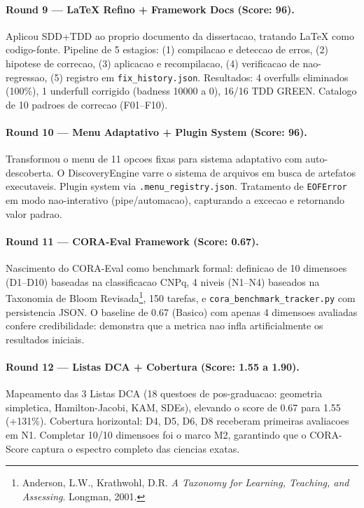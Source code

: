 \paragraph{Round 9 --- LaTeX Refino + Framework Docs (Score: 96).}

Aplicou SDD+TDD ao proprio documento da dissertacao, tratando LaTeX
como codigo-fonte. Pipeline de 5 estagios: (1) compilacao e deteccao
de erros, (2) hipotese de correcao, (3) aplicacao e recompilacao,
(4) verificacao de nao-regressao, (5) registro em \texttt{fix\_history.json}.
Resultados: 4 overfulls eliminados (100\%), 1 underfull corrigido
(badness 10000 a 0), 16/16 TDD GREEN. Catalogo de 10 padroes de
correcao (F01--F10).

\paragraph{Round 10 --- Menu Adaptativo + Plugin System (Score: 96).}

Transformou o menu de 11 opcoes fixas para sistema adaptativo com
auto-descoberta. O DiscoveryEngine varre o sistema de arquivos em busca
de artefatos executaveis. Plugin system via \texttt{.menu\_registry.json}.
Tratamento de \texttt{EOFError} em modo nao-interativo (pipe/automacao),
capturando a excecao e retornando valor padrao.

\paragraph{Round 11 --- CORA-Eval Framework (Score: 0.67).}

Nascimento do CORA-Eval como benchmark formal: definicao de 10 dimensoes
(D1--D10) baseadas na classificacao CNPq, 4 niveis (N1--N4) baseados na
Taxonomia de Bloom Revisada\footnote{Anderson, L.W., Krathwohl, D.R.
\textit{A Taxonomy for Learning, Teaching, and Assessing}. Longman, 2001.},
150 tarefas, e \texttt{cora\_benchmark\_tracker.py} com persistencia JSON.
O baseline de 0.67 (Basico) com apenas 4 dimensoes avaliadas confere
credibilidade: demonstra que a metrica nao infla artificialmente os
resultados iniciais.

\paragraph{Round 12 --- Listas DCA + Cobertura (Score: 1.55 a 1.90).}

Mapeamento das 3 Listas DCA (18 questoes de pos-graduacao: geometria
simpletica, Hamilton-Jacobi, KAM, SDEs), elevando o score de 0.67 para
1.55 (+131\%). Cobertura horizontal: D4, D5, D6, D8 receberam primeiras
avaliacoes em N1. Completar 10/10 dimensoes foi o marco M2, garantindo
que o CORA-Score captura o espectro completo das ciencias exatas.

